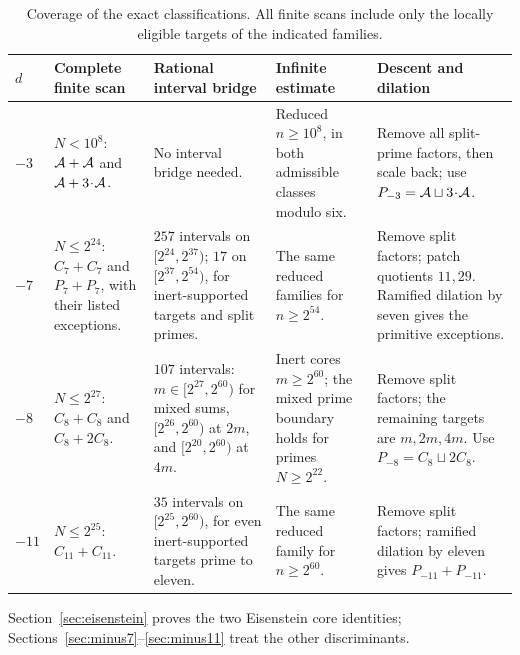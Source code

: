 \begin{table}[ht]
\centering\small
\setlength{\tabcolsep}{3pt}
\renewcommand{\arraystretch}{1.13}
\caption{Coverage of the exact classifications.  All finite scans include
only the locally eligible targets of the indicated families.}
\label{tab:exact-coverage}
\begin{tabular}{@{}>{\raggedright\arraybackslash}p{.045\linewidth}>{\raggedright\arraybackslash}p{.17\linewidth}>{\raggedright\arraybackslash}p{.255\linewidth}>{\raggedright\arraybackslash}p{.225\linewidth}>{\raggedright\arraybackslash}p{.24\linewidth}@{}}
\toprule
$d$&Complete finite scan&Rational interval bridge&Infinite estimate&Descent and dilation\\
\midrule
$-3$&$N<10^8$: $\AA+\AA$ and $\AA+3\!\cdot\!\AA$.
&No interval bridge needed.
&Reduced $n\ge10^8$, in both admissible classes modulo six.
&Remove all split-prime factors, then scale back; use $P_{-3}=\AA\sqcup3\!\cdot\!\AA$.\\[3pt]
$-7$&$N\le2^{24}$: $C_7+C_7$ and $P_7+P_7$, with their listed exceptions.
&$257$ intervals on $[2^{24},2^{37})$; $17$ on $[2^{37},2^{54})$, for inert-supported targets and split primes.
&The same reduced families for $n\ge2^{54}$.
&Remove split factors; patch quotients $11,29$.  Ramified dilation by seven gives the primitive exceptions.\\[3pt]
$-8$&$N\le2^{27}$: $C_8+C_8$ and $C_8+2C_8$.
&$107$ intervals: $m\in[2^{27},2^{60})$ for mixed sums, $[2^{26},2^{60})$ at $2m$, and $[2^{20},2^{60})$ at $4m$.
&Inert cores $m\ge2^{60}$; the mixed prime boundary holds for primes $N\ge2^{22}$.
&Remove split factors; the remaining targets are $m,2m,4m$.  Use $P_{-8}=C_8\sqcup2C_8$.\\[3pt]
$-11$&$N\le2^{25}$: $C_{11}+C_{11}$.
&$35$ intervals on $[2^{25},2^{60})$, for even inert-supported targets prime to eleven.
&The same reduced family for $n\ge2^{60}$.
&Remove split factors; ramified dilation by eleven gives $P_{-11}+P_{-11}$.\\
\bottomrule
\end{tabular}
\end{table}

Section~\ref{sec:eisenstein} proves the two Eisenstein core identities;
Sections~\ref{sec:minus7}--\ref{sec:minus11} treat the other discriminants.
